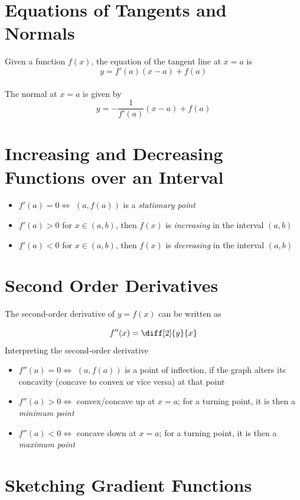 \documentclass[11pt]{article}
\newcommand{\lb}{\\[8pt]}
\begin{document}
\pagebreak

\section{Equations of Tangents and Normals}

Given a function $f(x)$, the equation of the tangent line at $x = a$ is $$y = f'(a)(x - a) + f(a)$$\lb
The normal at $x = a$ is given by $$y = -\frac{1}{f'(a)}(x - a) + f(a)$$

\vspace{2cm}

\section{Increasing and Decreasing Functions over an Interval}

\begin{itemize}
  \item $f'(a) = 0 \iff$ $(a, f(a))$ is a \textit{stationary point}
  \item $f'(a) > 0 $ for $x\in (a, b)$, then $f(x)$ is \textit{increasing} in the interval $(a, b)$
  \item $f'(a) < 0 $ for $x\in (a, b)$, then $f(x)$ is \textit{decreasing} in the interval $(a, b)$
\end{itemize}

\pagebreak

\section{Second Order Derivatives}

The second-order derivative of $y = f(x)$ can be written as

$$f''(x) = \diff[2]{y}{x}$$
Interpreting the second-order derivative
\begin{itemize}
  \item $f''(a) = 0 \iff$ $(a, f(a))$ is a point of inflection, if the graph alters its concavity (concave to convex or vice versa) at that point
  \item $f''(a) > 0 \iff$ convex/concave up at $x = a$; for a turning point, it is then a \textit{minimum point}
  \item $f''(a) < 0 \iff$ concave down at $x = a$; for a turning point, it is then a \textit{maximum point}
\end{itemize}

\section{Sketching Gradient Functions}
\end{document}
